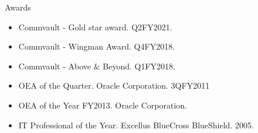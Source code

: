 \documentclass{resume} %
\begin{document}
\begin{rSection}{Awards}
   \begin{itemize}
      \itemsep -3pt {} 
      \item Commvault - Gold star award. Q2FY2021.
      \item Commvault - Wingman Award. Q4FY2018.
      \item Commvault - Above \& Beyond. Q1FY2018.
      \item OEA of the Quarter. Oracle Corporation. 3QFY2011
      \item OEA of the Year FY2013. Oracle Corporation.
      \item IT Professional of the Year. Excellus BlueCross BlueShield. 2005.
   \end{itemize}   
\end{rSection}
\end{document}
